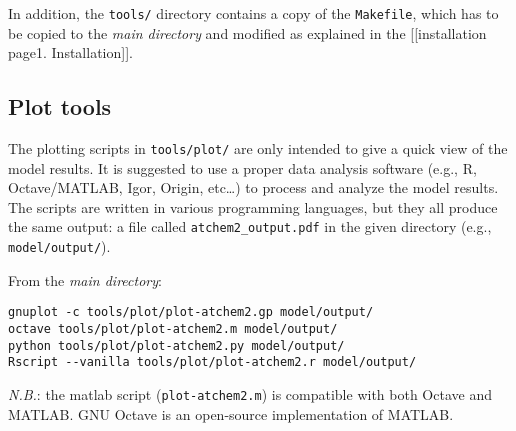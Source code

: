 In addition, the \texttt{tools/} directory contains a copy of the
\texttt{Makefile}, which has to be copied to the \emph{main directory}
and modified as explained in the {[}{[}installation page\textbar{}1.
Installation{]}{]}.

\subsection{Plot tools} \label{plot-tools}

The plotting scripts in \texttt{tools/plot/} are only intended to give a
quick view of the model results. It is suggested to use a proper data
analysis software (e.g., R, Octave/MATLAB, Igor, Origin, etc\ldots{}) to
process and analyze the model results. The scripts are written in
various programming languages, but they all produce the same output: a
file called \texttt{atchem2\_output.pdf} in the given directory (e.g.,
\texttt{model/output/}).

From the \emph{main directory}:

\begin{verbatim}
gnuplot -c tools/plot/plot-atchem2.gp model/output/
octave tools/plot/plot-atchem2.m model/output/
python tools/plot/plot-atchem2.py model/output/
Rscript --vanilla tools/plot/plot-atchem2.r model/output/
\end{verbatim}

\emph{N.B.}: the matlab script (\texttt{plot-atchem2.m}) is compatible
with both Octave and MATLAB. GNU Octave is an open-source implementation
of MATLAB.
